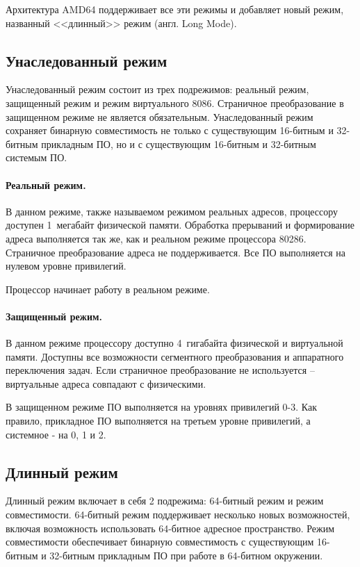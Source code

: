 Архитектура AMD64 поддерживает все эти режимы и добавляет новый режим,
названный <<длинный>> режим (англ. Long Mode).


\subsection{Унаследованный режим}
Унаследованный режим состоит из трех подрежимов: реальный режим, защищенный режим и режим виртуального 8086.
Страничное преобразование в защищенном режиме не является обязательным. Унаследованный режим сохраняет
бинарную совместимость не только с существующим 16-битным и 32-битным прикладным ПО, но и с существующим
16-битным и 32-битным системым ПО.

\paragraph{Реальный режим.}
В данном режиме, также называемом режимом реальных адресов, процессору доступен 1~мегабайт физической памяти.
Обработка прерываний и формирование адреса выполняется так же, как и реальном режиме процессора 80286.
Страничное преобразование адреса не поддерживается. Все ПО выполняется на нулевом уровне привилегий.

Процессор начинает работу в реальном режиме.

\paragraph{Защищенный режим.}
В данном режиме процессору доступно 4~гигабайта физической и виртуальной памяти. Доступны все возможности
сегментного преобразования и аппаратного переключения задач. Если страничное преобразование не используется --
виртуальные адреса совпадают с физическими.

В защищенном режиме ПО выполняется на уровнях привилегий 0-3. Как правило, прикладное ПО выполняется на третьем
уровне привилегий, а системное - на 0, 1 и 2.


\subsection{Длинный режим}
Длинный режим включает в себя 2 подрежима: 64-битный режим и режим совместимости.
64-битный режим поддерживает несколько новых возможностей, включая возможность
использовать 64-битное адресное пространство. Режим совместимости обеспечивает
бинарную совместимость с существующим 16-битным и 32-битным прикладным ПО при работе
в 64-битном окружении.


